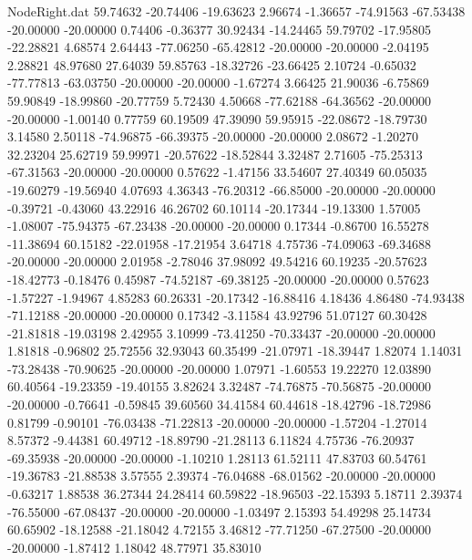 \begin{filecontents}{NodeRight.dat}
  59.74632  -20.74406  -19.63623     2.96674   -1.36657  -74.91563  -67.53438  -20.00000  -20.00000    0.74406   -0.36377   30.92434  -14.24465
  59.79702  -17.95805  -22.28821     4.68574    2.64443  -77.06250  -65.42812  -20.00000  -20.00000   -2.04195    2.28821   48.97680   27.64039
  59.85763  -18.32726  -23.66425     2.10724   -0.65032  -77.77813  -63.03750  -20.00000  -20.00000   -1.67274    3.66425   21.90036   -6.75869
  59.90849  -18.99860  -20.77759     5.72430    4.50668  -77.62188  -64.36562  -20.00000  -20.00000   -1.00140    0.77759   60.19509   47.39090
  59.95915  -22.08672  -18.79730     3.14580    2.50118  -74.96875  -66.39375  -20.00000  -20.00000    2.08672   -1.20270   32.23204   25.62719
  59.99971  -20.57622  -18.52844     3.32487    2.71605  -75.25313  -67.31563  -20.00000  -20.00000    0.57622   -1.47156   33.54607   27.40349
  60.05035  -19.60279  -19.56940     4.07693    4.36343  -76.20312  -66.85000  -20.00000  -20.00000   -0.39721   -0.43060   43.22916   46.26702
  60.10114  -20.17344  -19.13300     1.57005   -1.08007  -75.94375  -67.23438  -20.00000  -20.00000    0.17344   -0.86700   16.55278  -11.38694
  60.15182  -22.01958  -17.21954     3.64718    4.75736  -74.09063  -69.34688  -20.00000  -20.00000    2.01958   -2.78046   37.98092   49.54216
  60.19235  -20.57623  -18.42773    -0.18476    0.45987  -74.52187  -69.38125  -20.00000  -20.00000    0.57623   -1.57227   -1.94967    4.85283
  60.26331  -20.17342  -16.88416     4.18436    4.86480  -74.93438  -71.12188  -20.00000  -20.00000    0.17342   -3.11584   43.92796   51.07127
  60.30428  -21.81818  -19.03198     2.42955    3.10999  -73.41250  -70.33437  -20.00000  -20.00000    1.81818   -0.96802   25.72556   32.93043
  60.35499  -21.07971  -18.39447     1.82074    1.14031  -73.28438  -70.90625  -20.00000  -20.00000    1.07971   -1.60553   19.22270   12.03890
  60.40564  -19.23359  -19.40155     3.82624    3.32487  -74.76875  -70.56875  -20.00000  -20.00000   -0.76641   -0.59845   39.60560   34.41584
  60.44618  -18.42796  -18.72986     0.81799   -0.90101  -76.03438  -71.22813  -20.00000  -20.00000   -1.57204   -1.27014    8.57372   -9.44381
  60.49712  -18.89790  -21.28113     6.11824    4.75736  -76.20937  -69.35938  -20.00000  -20.00000   -1.10210    1.28113   61.52111   47.83703
  60.54761  -19.36783  -21.88538     3.57555    2.39374  -76.04688  -68.01562  -20.00000  -20.00000   -0.63217    1.88538   36.27344   24.28414
  60.59822  -18.96503  -22.15393     5.18711    2.39374  -76.55000  -67.08437  -20.00000  -20.00000   -1.03497    2.15393   54.49298   25.14734
  60.65902  -18.12588  -21.18042     4.72155    3.46812  -77.71250  -67.27500  -20.00000  -20.00000   -1.87412    1.18042   48.77971   35.83010

\end{filecontents}
